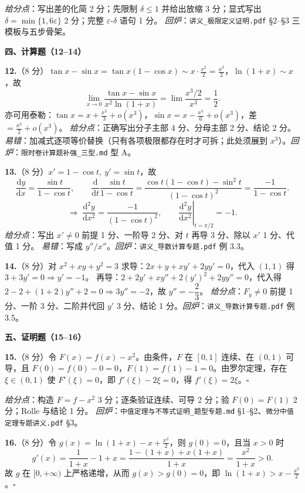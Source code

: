 \documentclass[11pt,a4paper]{ctexart}
\newcommand{\D}{\mathrm{d}}
\begin{document}
\noindent\textit{给分点}：写出差的化简 2 分；先限制 $\delta\le1$ 并给出放缩 3 分；显式写出 $\delta=\min\{1,6\varepsilon\}$ 2 分；完整 $\varepsilon$-$\delta$ 语句 1 分。
\textit{回炉}：\texttt{讲义\_极限定义证明.pdf} §2--§3 三模板与五步骨架。

\bigskip
\noindent\textbf{四、计算题（12--14）}

\textbf{12.}（8 分）$\tan x-\sin x=\tan x(1-\cos x)\sim x\cdot\frac{x^2}2=\frac{x^3}2$，$\ln(1+x)\sim x$，故
$$\lim_{x\to0}\frac{\tan x-\sin x}{x^2\ln(1+x)}=\lim\frac{x^3/2}{x^3}=\frac12.$$
亦可用泰勒：$\tan x=x+\frac{x^3}3+o(x^3)$，$\sin x=x-\frac{x^3}6+o(x^3)$，差 $=\frac{x^3}2+o(x^3)$。
\textit{给分点}：正确写出分子主部 4 分、分母主部 2 分、结论 2 分。
\textit{易错}：加减式逐项等价替换（只有各项极限都存在时才可拆；此处须展到 $x^3$）。\quad\textit{回炉}：\texttt{限时卷计算题补强\_三型.md} 型 A。

\textbf{13.}（8 分）$x'=1-\cos t,\ y'=\sin t$，故
$$\frac{\D y}{\D x}=\frac{\sin t}{1-\cos t},\qquad
\frac{\D}{\D t}\frac{\sin t}{1-\cos t}=\frac{\cos t(1-\cos t)-\sin^2t}{(1-\cos t)^2}=\frac{-1}{1-\cos t}.$$
$$\Rightarrow\ \frac{\D^2y}{\D x^2}=\frac{-1}{(1-\cos t)^2},\qquad \left.\frac{\D^2y}{\D x^2}\right|_{t=\pi/2}=-1.$$
\textit{给分点}：写出 $x'\ne0$ 前提 1 分、一阶导 2 分、对 $t$ 再导 3 分、除以 $x'$ 1 分、代值 1 分。
\textit{易错}：写成 $y''/x''$。\quad\textit{回炉}：\texttt{讲义\_导数计算专题.pdf} 例 3.3。

\textbf{14.}（8 分）对 $x^2+xy+y^2=3$ 求导：$2x+y+xy'+2yy'=0$，代入 $(1,1)$ 得 $3+3y'=0\Rightarrow y'=-1$。
再导：$2+2y'+xy''+2(y')^2+2yy''=0$，代入得 $2-2+(1+2)y''+2=0\Rightarrow 3y''=-2$，故 $y''=-\dfrac23$。
\textit{给分点}：$F_y\ne0$ 前提 1 分、一阶 3 分、二阶并代回 $y'$ 3 分、结论 1 分。\quad\textit{回炉}：\texttt{讲义\_导数计算专题.pdf} 例 3.5。

\bigskip
\noindent\textbf{五、证明题（15--16）}

\textbf{15.}（8 分）令 $F(x)=f(x)-x^2$。由条件，$F$ 在 $[0,1]$ 连续、在 $(0,1)$ 可导，且
$F(0)=f(0)-0=0$，$F(1)=f(1)-1=0$。由罗尔定理，存在 $\xi\in(0,1)$ 使 $F'(\xi)=0$，即 $f'(\xi)-2\xi=0$，得 $f'(\xi)=2\xi$。\quad$\square$

\noindent\textit{给分点}：构造 $F=f-x^2$ 3 分；逐条验证连续、可导 2 分；验 $F(0)=F(1)$ 2 分；Rolle 与结论 1 分。
\textit{回炉}：\texttt{中值定理与不等式证明\_题型专题.md} §1--§2、\texttt{微分中值定理专题讲义.pdf} §3。

\textbf{16.}（8 分）令 $g(x)=\ln(1+x)-x+\frac{x^2}2$，则 $g(0)=0$，且当 $x>0$ 时
$$g'(x)=\frac1{1+x}-1+x=\frac{1-(1+x)+x(1+x)}{1+x}=\frac{x^2}{1+x}>0.$$
故 $g$ 在 $[0,+\infty)$ 上严格递增，从而 $g(x)>g(0)=0$，即 $\ln(1+x)>x-\frac{x^2}2$。\quad$\square$
\end{document}
